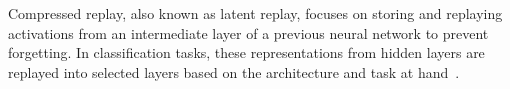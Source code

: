 Compressed replay, also known as latent replay, focuses on storing and replaying activations from an intermediate layer of a previous neural network to prevent forgetting. In classification tasks, these representations from hidden layers are replayed into selected layers based on the architecture and task at hand~\cite{pellegrini2020latent,ostapenko2022foundational,hayes2020remind}. 








